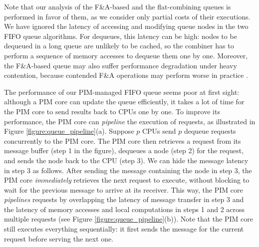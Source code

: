 Note that our analysis of the F\&A-based and the flat-combining queues is performed in favor of them, 
as we consider only partial costs of their executions. 
We have ignored the latency of accessing and modifying queue nodes in the two FIFO queue algorithms. 
For dequeues, this latency can be high: nodes to be dequeued in a long queue are unlikely 
to be cached, so the combiner has to perform a sequence of memory accesses to dequeue them one by one.  
Moreover, the F\&A-based queue may also suffer performance degradation under heavy contention, 
because contended F\&A operations may perform worse in practice \cite{David13}.

The performance of our PIM-managed FIFO queue seems poor at first sight: although a PIM core can update 
the queue efficiently, it takes a lot of time for the PIM core to send results back to CPUs one by one. 
To improve its performance, the PIM core can \textit{pipeline} the execution of requests, 
as illustrated in Figure \ref{figure:queue_pipeline}(a). 
Suppose $p$ CPUs send $p$ dequeue requests concurrently to the PIM core. 
The PIM core then retrieves a request from its message buffer (step 1 in the figure), 
dequeues a node (step 2) for the request, and sends the node back to the CPU (step 3). 
We can hide the message latency in step 3 as follows. 
After sending the message containing the node in step 3, the PIM core \emph{immediately} retrieves the next 
request to execute, without blocking to wait for the previous message to arrive at its receiver. 
This way, the PIM core \emph{pipelines} requests by overlapping the latency of message transfer in step 3  
and the latency of memory accesses and local computations in steps 1 and 2 across multiple requests 
(see Figure \ref{figure:queue_pipeline}(b)). 
Note that the PIM core still executes everything sequentially: 
it first sends the message for the current request before serving the next one.

